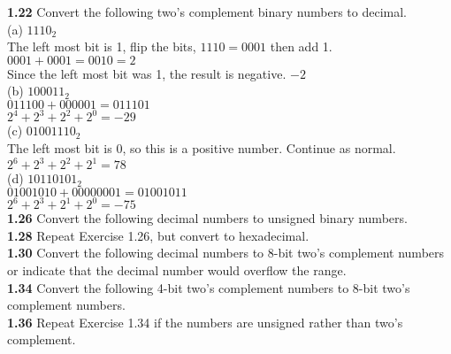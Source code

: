 \documentclass[12pt,a4paper]{report}
\begin{document}
\begin{normalsize}
\textbf{1.22} Convert the following two's complement binary numbers to decimal. \\
(a) $ 1110_{2} $ \\ 
The left most bit is 1, flip the bits, $ 1110 = 0001 $ then add 1. $ 0001 + 0001 = 0010 = 2 $ \\
Since the left most bit was 1, the result is negative. $ -2 $ \\
(b) $ 100011_{2} $ \\ 
$ 011100 + 000001 = 011101 $ \\
$ 2^{4} + 2^{3} + 2^{2} + 2^{0} = -29 $ \\
(c) $ 01001110_{2} $ \\ 
The left most bit is 0, so this is a positive number. Continue as normal. \\
$ 2^{6} + 2^{3} + 2^{2} + 2^{1} = 78 $ \\
(d) $ 10110101_{2} $ \\ 
$ 01001010 + 00000001 = 01001011 $ \\
$  2^{6} + 2^{3} + 2^{1} + 2^{0} = -75 $ \\

\textbf{1.26} Convert the following decimal numbers to unsigned binary numbers. \\

\textbf{1.28} Repeat Exercise 1.26, but convert to hexadecimal. \\

\textbf{1.30} Convert the following decimal numbers to 8-bit two's complement numbers or indicate that the decimal number would overflow the range. \\

\textbf{1.34} Convert the following 4-bit two's complement numbers to 8-bit two's complement numbers. \\

\textbf{1.36} Repeat Exercise 1.34 if the numbers are unsigned rather than two's complement. \\








\end{normalsize}
\end{document}

